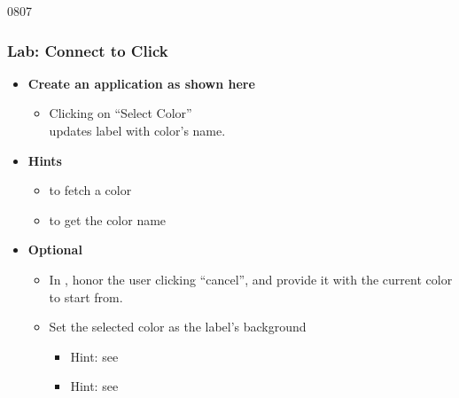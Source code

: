 \begin{slide}[fragile]{0807}
\frametitle{Lab: Connect to Click}
\label{project_signal_slot}
\begin{itemize}
\item \textbf{Create an application as shown here}
  \begin{itemize}
  \item Clicking on ``Select Color'' \\
    updates label with color's name.
  \end{itemize}
\item \textbf{Hints}
  \begin{itemize}
  \item {} to fetch a color
  \item {} to get the color name
 \end{itemize}
\item \textbf{Optional}
  \begin{itemize}
  \item In , honor the user clicking
    ``cancel'', and provide it with the current color to start from.
  \item Set the selected color as the label's background 
    \begin{itemize}
    \item Hint: see 
    \item Hint: see 
    \end{itemize}

  \end{itemize}
\end{itemize}
\vfill
{}
\end{slide}

